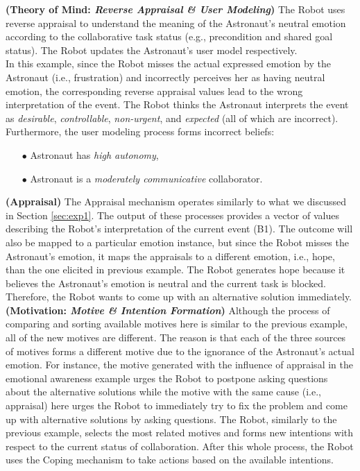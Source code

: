 \noindent\textbf{(Theory of Mind: \textit{Reverse Appraisal \& User Modeling})}
The Robot uses reverse appraisal to understand the meaning of the Astronaut's
neutral emotion according to the collaborative task status (e.g., precondition
and shared goal status). The Robot updates the Astronaut's user model
respectively.\\

In this example, since the Robot misses the actual expressed emotion by the
Astronaut (i.e., frustration) and incorrectly perceives her as having neutral
emotion, the corresponding reverse appraisal values lead to the wrong
interpretation of the event. The Robot thinks the Astronaut interprets the
event as \textit{desirable}, \textit{controllable}, \textit{non-urgent}, and
\textit{expected} (all of which are incorrect). Furthermore, the user modeling
process forms incorrect beliefs:

\begin{itemize}
  \item[$\bullet$] Astronaut has \textit{high autonomy},
  \item[$\bullet$] Astronaut is a \textit{moderately communicative}
  collaborator.
\end{itemize}

\noindent\textbf{(Appraisal)} The Appraisal mechanism operates similarly to what
we discussed in Section \ref{sec:exp1}. The output of these processes provides a
vector of values describing the Robot's interpretation of the current event
(B1). The outcome will also be mapped to a particular emotion instance, but
since the Robot misses the Astronaut's emotion, it maps the appraisals to a
different emotion, i.e., hope, than the one elicited in previous example. The
Robot generates hope because it believes the Astronaut's emotion is neutral and
the current task is blocked. Therefore, the Robot wants to come up with an
alternative solution immediately.\\

\noindent\textbf{(Motivation: \textit{Motive \& Intention Formation})} Although
the process of comparing and sorting available motives here is similar to the
previous example, all of the new motives are different. The reason is that each
of the three sources of motives forms a different motive due to the ignorance of
the Astronaut's actual emotion. For instance, the motive generated with the
influence of appraisal in the emotional awareness example urges the Robot to
postpone asking questions about the alternative solutions while the motive with
the same cause (i.e., appraisal) here urges the Robot to immediately try to fix
the problem and come up with alternative solutions by asking questions. The
Robot, similarly to the previous example, selects the most related motives and
forms new intentions with respect to the current status of collaboration. After
this whole process, the Robot uses the Coping mechanism to take actions based on
the available intentions.\\

